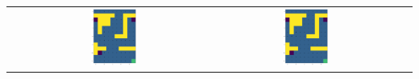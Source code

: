 \begin{center}
\begin{tabular}{c | c  c  c}
        & 
            \includegraphics[width=0.25\textwidth]{assets/dp/analysis/prob_0.25_gamma_0.8_policy.png}
        &
            \includegraphics[width=0.25\textwidth]{assets/dp/analysis/prob_0.5_gamma_0.8_policy.png}
    \end{tabular}        
\end{center}

